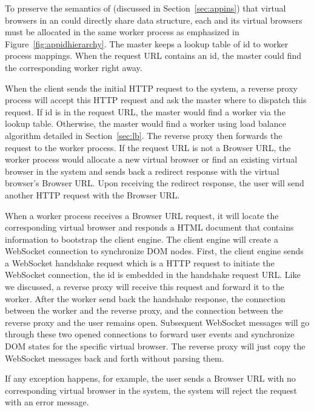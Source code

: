 
To preserve the semantics of \appins (discussed in Section~\ref{sec:appins})
that virtual browsers in an \appins could directly share data structure, each
\appins and its virtual browsers must be allocated in the same worker process
as emphasized in Figure~\ref{fig:appidhierarchy}. The master keeps a lookup
table of \appins id to worker process mappings.  When the request URL contains
an \appins id,  the master could find the corresponding worker right away.

When the client sends the initial HTTP request to the system, a reverse proxy
process will accept this HTTP request and ask the master where to dispatch
this request. If \appins id is in the request URL, the master would find a
worker via the lookup table. Otherwise, the master would find a worker using
load balance algorithm detailed in Section~\ref{sec:lb}. The reverse proxy
then forwards the request to the worker process. If the request URL is not a
Browser URL, the worker process would allocate a new virtual browser or find
an existing virtual browser in the system and sends back a redirect response
with the virtual browser's Browser URL. Upon receiving the redirect response,
the user will send another HTTP request with the Browser URL.

When a worker process receives a Browser URL request, it will locate the
corresponding virtual browser and responds a HTML document that contains
information to bootstrap the client engine. The client engine will create a
WebSocket connection to synchronize DOM nodes. First, the client engine sends
a WebSocket handshake request which is a HTTP request to initiate the
WebSocket connection, the \appins id is embedded in the handshake request URL.
Like we discussed, a reverse proxy will receive this request and forward it to
the worker. After the worker send back the handshake response, the connection
between the worker and the reverse proxy, and the connection between the
reverse proxy and the user remains open. Subsequent WebSocket messages will go
through these two opened connections to forward user events and synchronize
DOM states for the specific virtual browser. The reverse proxy will just copy
the WebSocket messages back and forth without parsing them.

If any exception happens, for example, the user sends a Browser URL with no
corresponding virtual browser in the system, the system will reject the
request with an error message.

